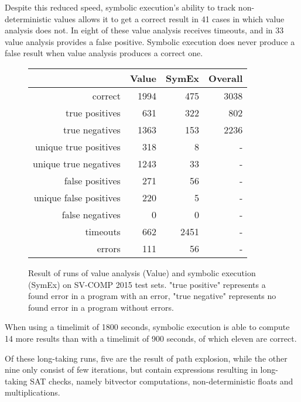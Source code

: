 Despite this reduced speed, symbolic execution's ability to track non-deterministic values allows it to get a correct result in 41 cases in which value analysis does not. In eight of these value analysis receives timeouts, and in 33 value analysis provides a false positive. Symbolic execution does never produce a false result when value analysis produces a correct one.
\begin{figure}
\begin{tabular}{| r || r | r | r |}
\hline
        & Value & SymEx & Overall \\ \hline
correct                & 1994 &  475 & 3038 \\ \hline
true positives         &  631 &  322 &  802 \\ \hline
true negatives         & 1363 &  153 & 2236 \\ \hline
unique true positives  &  318 &    8 &    - \\ \hline
unique true negatives  & 1243 &   33 &    - \\ \hline
false positives        &  271 &   56 &    - \\ \hline
unique false positives &  220 &    5 &    - \\ \hline
false negatives        &    0 &    0 &    - \\ \hline 
timeouts               &  662 & 2451 &    - \\ \hline
errors                 &  111 &   56 &    - \\ \hline
\end{tabular}
\label{tab:diff}
\caption{Result of runs of value analysis (Value) and symbolic execution (SymEx) on SV-COMP 2015 test sets.
  "true positive" represents a found error in a program with an error,
  "true negative" represents no found error in a program without errors.}
\end{figure}

When using a timelimit of 1800 seconds, symbolic execution is able to compute 14 more results than with a timelimit of 900 seconds, of which eleven are correct.

Of these long-taking runs, five are the result of path explosion,
while the other nine only consist of few iterations, but contain expressions resulting in long-taking SAT checks, namely bitvector computations, non-deterministic floats and multiplications.

